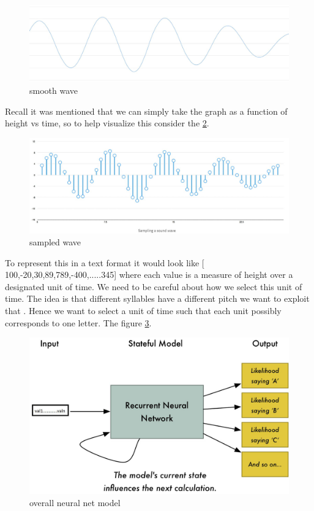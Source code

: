 \documentclass[sigconf]{acmart}
\begin{document}
\begin{figure}[!ht]
  \centering\includegraphics[width=\columnwidth]{images/rephello.jpg}
  \caption{smooth wave}\label{f:smooth}
\end{figure} 
Recall it was mentioned that we can simply take the graph as a function of height vs time, so to help visualize this consider the \ref{f:samplegraph}.
\begin{figure}[!ht]
  \centering\includegraphics[width=\columnwidth]{images/soundwavesampled.jpg}
  \caption{sampled wave}\label{f:samplegraph}
\end{figure}
To represent this in a text format it would look like [ 100,-20,30,89,789,-400,.....345] where each value is a measure of height over a designated unit of time. We need to be careful about how we select this unit of time. The idea is that different syllables have a different pitch we want to exploit that \cite{2017a} . Hence we want to select a unit of time such that each unit possibly corresponds to one letter. The figure \ref{f:modeloverall}.
\begin{figure}[!ht]
  \centering\includegraphics[width=\columnwidth]{images/neuralnetimgsound.jpg}
  \caption{overall neural net model}\label{f:modeloverall}
\end{figure} 
\end{document}
